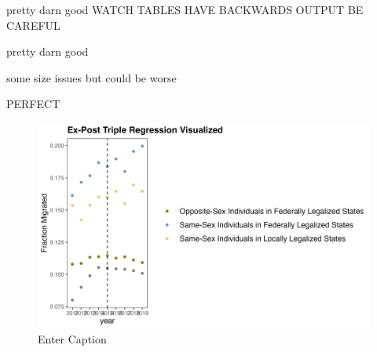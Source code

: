 \documentclass[]{article}
\begin{document}
\begin{landscape}
\begin{center}

\end{center}
\end{landscape}
pretty darn good
WATCH TABLES HAVE BACKWARDS OUTPUT BE CAREFUL
\clearpage


pretty darn good

\clearpage

\begin{landscape}
\begin{center}

\end{center}
\end{landscape}
some size issues but could be worse

\clearpage

\begin{landscape}
\begin{center}

\end{center}
\end{landscape}
PERFECT

\clearpage

\begin{figure}
    \centering
    \includegraphics[width=1\linewidth]{outputs/summary_stats/post_trends.png}
    \caption{Enter Caption}
    \label{fig:enter-label}
\end{figure}
\end{document}

